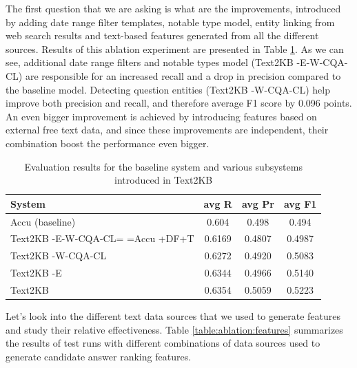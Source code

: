 The first question that we are asking is what are the improvements, introduced by adding date range filter templates, notable type model, entity linking from web search results and text-based features generated from all the different sources.
Results of this ablation experiment are presented in Table \ref{table:ablation:entities_vs_features}.
As we can see, additional date range filters and notable types model (Text2KB -E-W-CQA-CL) are responsible for an increased recall and a drop in precision compared to the baseline model.
Detecting question entities (Text2KB -W-CQA-CL) help improve both precision and recall, and therefore average F1 score by 0.096 points.
An even bigger improvement is achieved by introducing features based on external free text data, and since these improvements are independent, their combination boost the performance even bigger.

\begin{table}
\caption{Evaluation results for the baseline system and various subsystems introduced in Text2KB}
\label{table:ablation:entities_vs_features}
\begin{tabular}{| p{4.2cm} | c | c | c | }
\hline
System & avg R & avg Pr &  avg F1 \\
\hline
Accu (baseline) & 0.604 & 0.498 & 0.494\\
Text2KB -E-W-CQA-CL= =Accu +DF+T & 0.6169 & 0.4807 & 0.4987 \\
Text2KB -W-CQA-CL & 0.6272 & 0.4920 & 0.5083 \\  %
Text2KB -E & 0.6344 & 0.4966 & 0.5140 \\  %
\hline
Text2KB & 0.6354 & 0.5059 & 0.5223 \\
\hline
\end{tabular}
\end{table}

Let's look into the different text data sources that we used to generate features and study their relative effectiveness.
Table \ref{table:ablation:features} summarizes the results of test runs with different combinations of data sources used to generate candidate answer ranking features.

